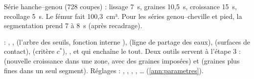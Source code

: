 \begin{exemple}
Série hanche--genou (728 coupes) : lissage 7~s, graines 10,5~s, croissance 15~s, recollage 5~s. Le fémur fait
100,3~cm³. Pour les séries genou--cheville et pied, la segmentation prend 7 à 8~s (après recadrage).
\end{exemple}

\begin{danslecode}
 : , ,
 (l'arbre des seuils, fonction interne ),  (ligne de
partage des eaux),  (surfaces de contact),  (critère $c^*$),
, et  qui enchaîne le tout. Deux outils servent à l'étape 3 :
 (nouvelle croissance dans une zone, avec des graines imposées) et  (graines plus
fines dans un seul segment). Réglages : , , ,
, \ldots{} (\cref{ann:parametres}).
\end{danslecode}

